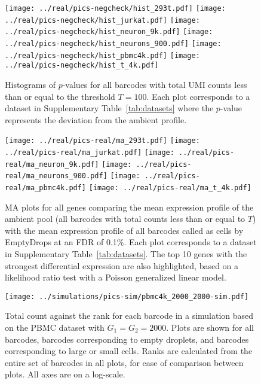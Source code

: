 \documentclass{article}
\begin{document}



\newpage
\begin{figure}[btp]
    \begin{center}
        \texttt{[image: ../real/pics-negcheck/hist\_293t.pdf]}
        \texttt{[image: ../real/pics-negcheck/hist\_jurkat.pdf]}
        \texttt{[image: ../real/pics-negcheck/hist\_neuron\_9k.pdf]}
        \texttt{[image: ../real/pics-negcheck/hist\_neurons\_900.pdf]}
        \texttt{[image: ../real/pics-negcheck/hist\_pbmc4k.pdf]}
        \texttt{[image: ../real/pics-negcheck/hist\_t\_4k.pdf]}
    \end{center}
    \caption{Histograms of $p$-values for all barcodes with total UMI counts less than or equal to the threshold $T=100$.
        Each plot corresponds to a dataset in Supplementary Table~\ref{tab:datasets} where the $p$-value represents the deviation from the ambient profile.
    }
    \label{fig:negative}
\end{figure}

\begin{figure}[btp]
    \begin{center}
        \texttt{[image: ../real/pics-real/ma\_293t.pdf]}
        \texttt{[image: ../real/pics-real/ma\_jurkat.pdf]}
        \texttt{[image: ../real/pics-real/ma\_neuron\_9k.pdf]}
        \texttt{[image: ../real/pics-real/ma\_neurons\_900.pdf]}
        \texttt{[image: ../real/pics-real/ma\_pbmc4k.pdf]}
        \texttt{[image: ../real/pics-real/ma\_t\_4k.pdf]}
    \end{center}
    \caption{MA plots for all genes comparing the mean expression profile of the ambient pool (all barcodes with total counts less than or equal to $T$) with the mean expression profile of all barcodes called as cells by EmptyDrops at an FDR of 0.1\%.
        Each plot corresponds to a dataset in Supplementary Table~\ref{tab:datasets}.
        The top 10 genes with the strongest differential expression are also highlighted, based on a likelihood ratio test with a Poisson generalized linear model.
    }
    \label{fig:ma}
\end{figure}

\begin{figure}[btp]
    \begin{center}
        \texttt{[image: ../simulations/pics-sim/pbmc4k\_2000\_2000-sim.pdf]}
    \end{center}
\caption{Total count against the rank for each barcode in a simulation based on the PBMC dataset with $G_1=G_2=2000$.
Plots are shown for all barcodes, barcodes corresponding to empty droplets, and barcodes corresponding to large or small cells.
Ranks are calculated from the entire set of barcodes in all plots, for ease of comparison between plots.
All axes are on a log-scale.}
\end{figure}
\end{document}
